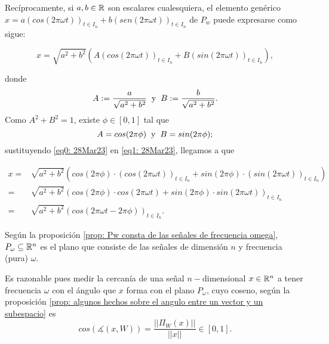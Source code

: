 Recíprocamente, si $a, b \in \mathbb{R}$ son escalares cualesquiera, 
el elemento genérico
$x=  a \left( cos \left(2 \pi \omega t \right) \right)_{t \in I_{n}} +
b ( sen (2 \pi \omega t ))_{t \in I_{n}} $ de $P_{w}$ puede
expresarse como sigue:

\begin{equation}
\label{eq1: 28Mar23}
x = \sqrt{a^{2}+b^{2}} \left(
A  \left( cos \left(2 \pi \omega t \right) \right)_{t \in I_{n}} +
B  \left( sin \left(2 \pi \omega t \right) \right)_{t \in I_{n}}
\right),
\end{equation}

\noindent
donde
\[
A := \frac{a}{\sqrt{a^{2}+b^{2}}} \hspace{0.2cm} \text{y} \hspace{0.2cm}
B := \frac{b}{\sqrt{a^{2}+b^{2}}}.
\]
Como $A^{2}+ B^{2}=1$, existe $\phi \in [0,1]$ tal que
\begin{equation}
\label{eq0: 28Mar23}
A = cos (2 \pi \phi) \hspace{0.2cm} \text{y}  \hspace{0.2cm}
B = sin (2 \pi \phi);
\end{equation}
sustituyendo \eqref{eq0: 28Mar23} en \eqref{eq1: 28Mar23}, llegamos
a que

\begin{align*}
x = &  \sqrt{a^{2}+b^{2}} (
cos(2 \pi \phi) \cdot (cos (2 \pi \omega t))_{t \in I_{n}} + 
sin(2 \pi \phi) \cdot (sin (2 \pi \omega t))_{t \in I_{n}} 
) \\
= & \sqrt{a^{2}+b^{2}} (
cos(2 \pi \phi) \cdot cos (2 \pi \omega t) +
sin(2 \pi \phi) \cdot sin (2 \pi \omega t) 
)_{t \in I_{n}}  \\
= &  \sqrt{a^{2}+b^{2}} (
cos (2 \pi \omega t - 2 \pi \phi)
)_{t \in I_{n}}.
\end{align*}

\QEDB
\vspace{0.2cm}


\noindent 
Según la proposición
\ref{prop: Pw consta de las señales de frecuencia omega},
$P_{\omega} \subseteq \mathbb{R}^{n}$ es el plano que consiste de las señales
de dimensión $n$ y frecuencia (pura) $\omega$.


Es razonable pues
medir la cercanía de una señal $n-$dimensional $x \in \mathbb{R}^{n}$
a tener frecuencia $\omega$
con el ángulo que $x$ forma con el plano $P_{\omega}$,
cuyo coseno, según la proposición
\ref{prop: algunos hechos sobre el angulo entre un vector y un subespacio}
es
\begin{equation}
\label{eq0: 20Mar}
cos \left( \measuredangle (x, W) \right) = \frac{|| \Pi_{W}(x) ||}{||x||}
\in [0,1].
\end{equation}

